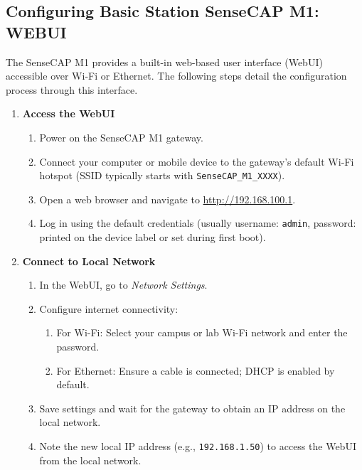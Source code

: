 \subsection{Configuring Basic Station SenseCAP M1: WEBUI}
\label{subsec:sensecap_m1_webui}

The SenseCAP M1 provides a built-in web-based user interface (WebUI) accessible over Wi-Fi or Ethernet. The following steps detail the configuration process through this interface.

\begin{enumerate}
    \item \textbf{Access the WebUI}
          \begin{enumerate}
              \item Power on the SenseCAP M1 gateway.
              \item Connect your computer or mobile device to the gateway’s default Wi-Fi hotspot (SSID typically starts with \texttt{SenseCAP\_M1\_XXXX}).
              \item Open a web browser and navigate to \url{http://192.168.100.1}.
              \item Log in using the default credentials (usually username: \texttt{admin}, password: printed on the device label or set during first boot).
          \end{enumerate}

    \item \textbf{Connect to Local Network}
          \begin{enumerate}
              \item In the WebUI, go to \textit{Network Settings}.
              \item Configure internet connectivity:
                    \begin{enumerate}
                        \item For Wi-Fi: Select your campus or lab Wi-Fi network and enter the password.
                        \item For Ethernet: Ensure a cable is connected; DHCP is enabled by default.
                    \end{enumerate}
              \item Save settings and wait for the gateway to obtain an IP address on the local network.
              \item Note the new local IP address (e.g., \texttt{192.168.1.50}) to access the WebUI from the local network.
          \end{enumerate}


\end{enumerate}
